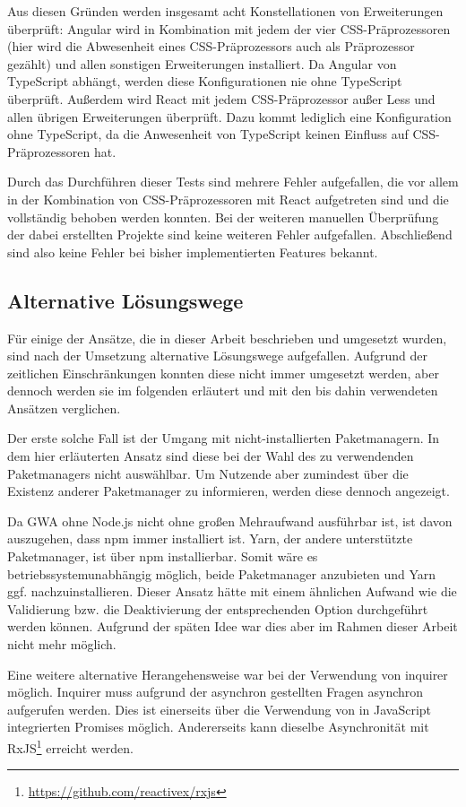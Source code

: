 Aus diesen Gründen werden insgesamt acht Konstellationen von Erweiterungen überprüft: Angular wird in Kombination mit jedem der vier CSS-Präprozessoren (hier wird die Abwesenheit eines CSS-Präprozessors auch als Präprozessor gezählt) und allen sonstigen Erweiterungen installiert. Da Angular von TypeScript abhängt, werden diese Konfigurationen nie ohne TypeScript überprüft. Außerdem wird React mit jedem CSS-Präprozessor außer Less und allen übrigen Erweiterungen überprüft. Dazu kommt lediglich eine Konfiguration ohne TypeScript, da die Anwesenheit von TypeScript keinen Einfluss auf CSS-Präprozessoren hat.

Durch das Durchführen dieser Tests sind mehrere Fehler aufgefallen, die vor allem in der Kombination von CSS-Präprozessoren mit React aufgetreten sind und die vollständig behoben werden konnten. Bei der weiteren manuellen Überprüfung der dabei erstellten Projekte sind keine weiteren Fehler aufgefallen. Abschließend sind also keine Fehler bei bisher implementierten Features bekannt.

\subsection{Alternative Lösungswege}
Für einige der Ansätze, die in dieser Arbeit beschrieben und umgesetzt wurden, sind nach der Umsetzung alternative Lösungswege aufgefallen. Aufgrund der zeitlichen Einschränkungen konnten diese nicht immer umgesetzt werden, aber dennoch werden sie im folgenden erläutert und mit den bis dahin verwendeten Ansätzen verglichen.

Der erste solche Fall ist der Umgang mit nicht-installierten Paketmanagern. In dem hier erläuterten Ansatz sind diese bei der Wahl des zu verwendenden Paketmanagers nicht auswählbar. Um Nutzende aber zumindest über die Existenz anderer Paketmanager zu informieren, werden diese dennoch angezeigt.

Da \gls{GWA} ohne Node.js nicht ohne großen Mehraufwand ausführbar ist, ist davon auszugehen, dass \gls{npm} immer installiert ist. Yarn, der andere unterstützte Paketmanager, ist über \gls{npm} installierbar. Somit wäre es betriebssystemunabhängig möglich, beide Paketmanager anzubieten und Yarn ggf. nachzuinstallieren. Dieser Ansatz hätte mit einem ähnlichen Aufwand wie die Validierung bzw. die Deaktivierung der entsprechenden Option durchgeführt werden können. Aufgrund der späten Idee war dies aber im Rahmen dieser Arbeit nicht mehr möglich.

Eine weitere alternative Herangehensweise war bei der Verwendung von inquirer möglich. Inquirer muss aufgrund der asynchron gestellten Fragen asynchron aufgerufen werden. Dies ist einerseits über die Verwendung von in JavaScript integrierten Promises möglich. Andererseits kann dieselbe Asynchronität mit RxJS\footnote{\url{https://github.com/reactivex/rxjs}} erreicht werden.

